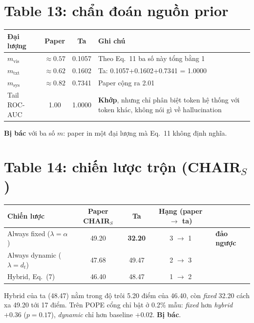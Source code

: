 \documentclass[10pt,a4paper]{article}
\newcommand{\ok}[1]{\textcolor{okc}{\textbf{#1}}}
\newcommand{\bad}[1]{\textcolor{badc}{\textbf{#1}}}
\begin{document}
\section{Table 13: chẩn đoán nguồn prior}
\begin{center}\small
\begin{tabular}{@{}lccL{6cm}@{}}
\toprule
Đại lượng & Paper & Ta & Ghi chú \\
\midrule
$m_{\mathrm{vis}}$ & $\approx 0.57$ & 0.1057 & Theo Eq.~11 ba số này tổng bằng 1 \\
$m_{\mathrm{txt}}$ & $\approx 0.62$ & 0.1602 & Ta: 0.1057+0.1602+0.7341 = 1.0000 \\
$m_{\mathrm{sys}}$ & $\approx 0.82$ & 0.7341 & Paper cộng ra 2.01 \\
Tail ROC-AUC & 1.00 & 1.0000 & \ok{Khớp}, nhưng chỉ phân biệt token hệ thống với token khác, không nói gì về hallucination \\
\bottomrule
\end{tabular}
\end{center}
\noindent\small \bad{Bị bác} với ba số $m$: paper in một đại lượng mà Eq.~11 không định nghĩa.

\section{Table 14: chiến lược trộn (CHAIR$_S$)}
\begin{center}\small
\begin{tabular}{@{}lcccl@{}}
\toprule
Chiến lược & Paper CHAIR$_S$ & Ta & Hạng (paper $\to$ ta) & \\
\midrule
Always fixed ($\lambda=\alpha$) & 49.20 & \textbf{32.20} & 3 $\to$ 1 & \bad{đảo ngược} \\
Always dynamic ($\lambda=d_t$) & 47.68 & 49.47 & 2 $\to$ 3 & \\
Hybrid, Eq.~(7) & 46.40 & 48.47 & 1 $\to$ 2 & \\
\bottomrule
\end{tabular}
\end{center}
\noindent\small Hybrid của ta (48.47) nằm trong độ trôi 5.20 điểm của 46.40, còn \emph{fixed} 32.20 cách xa 49.20 tới 17 điểm. Trên POPE cổng chỉ bật ở 0.2\% mẫu: \emph{fixed} hơn \emph{hybrid} $+0.36$ ($p=0.17$), \emph{dynamic} chỉ hơn baseline $+0.02$. \bad{Bị bác}.
\end{document}
